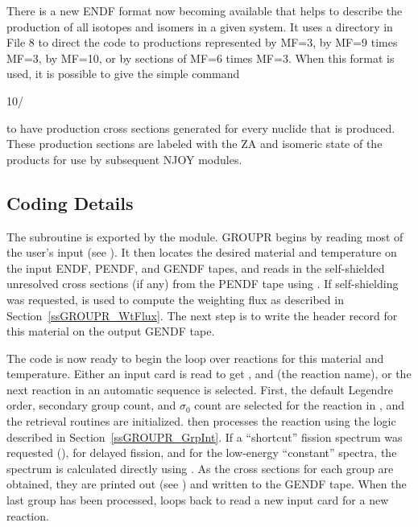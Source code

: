 There is a new ENDF format now becoming available that helps to
describe the production of all isotopes and isomers in a given system.
It uses a directory in File 8 to direct the code to productions
represented by MF=3, by MF=9 times MF=3, by MF=10, or by sections
of MF=6 times MF=3.  When this format is used, it is possible to
give the simple command

\small
\begin{ccode}

 10/

\end{ccode}
\normalsize

\noindent
to have production cross sections generated for every nuclide that
is produced.  These production sections are labeled with the ZA and
isomeric state of the products for use by subsequent NJOY modules.


\subsection{Coding Details}
\label{ssGROUPR_details}

The  subroutine is exported
by the  module.
GROUPR begins by reading most of the user's input (see
).  It then
locates the desired material and temperature on the input ENDF,
PENDF, and GENDF tapes, and reads in
the self-shielded unresolved cross sections (if any) from the PENDF
tape using .  If
self-shielding was requested, 
is used to compute the weighting flux as described in
Section~\ref{ssGROUPR_WtFlux}.  The
next step is to write the header record for this material on the
output GENDF tape.

The code is now ready to begin the loop over reactions for this
material and temperature.  Either an input card is read to
get ,  and  (the reaction name),
or the next reaction in
an automatic sequence is selected.  First, the default Legendre order,
secondary group count, and $\sigma_0$ count are selected for the reaction
in , and the retrieval routines are
initialized.   then processes the reaction using the
 logic described in
Section~\ref{ssGROUPR_GrpInt}.  If a ``shortcut'' fission
spectrum was requested (), for delayed fission, and
for the low-energy ``constant'' spectra, the spectrum is calculated
directly using .  As the cross
sections for each group are obtained, they are printed out
(see ) and written to the
GENDF tape.  When the last group has been processed, 
loops back to read a new input card for a new reaction.

